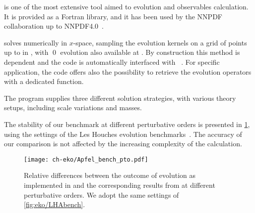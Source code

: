 \apfel{} \cite{Bertone:2013vaa} is one of the most extensive tool aimed to
\pdf{}  evolution and \dis{} observables calculation.
It is provided as a Fortran library, and it has been used by the NNPDF
collaboration up to NNPDF4.0~\cite{NNPDF:2021njg}.

\apfel{} solves \dglap{} numerically in $x$-space, sampling the evolution
kernels on a grid of points up to \nnlo{} in \qcd{}, with \qed{} evolution also
available at \lo{}.
By construction this method is \pdf{} dependent and the code is automatically
interfaced with \lhapdf{}~\cite{Buckley:2014ana}. For specific application,
the code offers also the possibility to retrieve the evolution operators
with a dedicated function.

The program supplies three different solution strategies, with various theory
setups, including scale variations and \msbar{} masses.

The stability of our benchmark at different perturbative orders is presented in \cref{fig:eko/Apfelbench_pto},
using the settings of the Les Houches \pdf{} evolution benchmarks~\cite{Giele:2002hx,Dittmar:2005ed}.
The accuracy of our comparison is not affected by the increasing complexity
of the calculation.

\begin{figure}
    \texttt{[image: ch-eko/Apfel\_bench\_pto.pdf]}
    \caption{Relative differences between the outcome of evolution as
        implemented in \eko{} and the corresponding results from \apfel{} at
        different perturbative orders.  We adopt the same settings of
        \cref{fig:eko/LHAbench}.}
    \label{fig:eko/Apfelbench_pto}
\end{figure}

